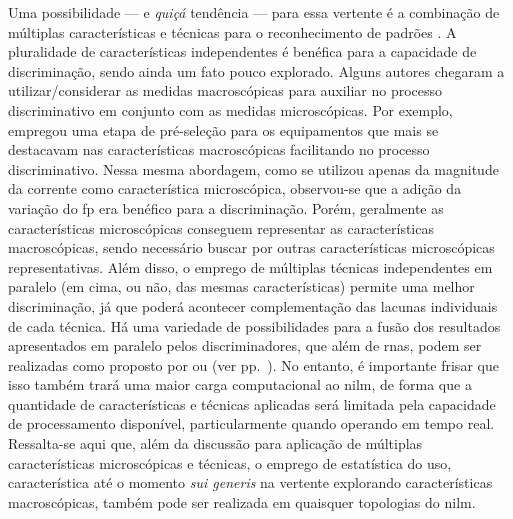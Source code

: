 Uma possibilidade --- e \emph{quiçá} tendência --- para essa vertente é a
combinação de múltiplas características e técnicas para o
reconhecimento de padrões \cite{
nilm_zeifman_vast_hisample_pdfmerge_2011,nilm_liang_pt1_2010_34,
nilm_liang_pt2_2010_40}. A pluralidade de características
independentes é benéfica para a capacidade de discriminação, sendo
ainda um fato pouco explorado. Alguns autores chegaram a
utilizar/considerar as medidas macroscópicas para auxiliar no processo
discriminativo em conjunto com as medidas microscópicas. Por exemplo,
\cite{nilm_coppe_nascimento} empregou uma etapa de pré-seleção para os
equipamentos que mais se destacavam nas características macroscópicas
facilitando no processo discriminativo. Nessa mesma abordagem, como se
utilizou apenas da magnitude da corrente como característica
microscópica, observou-se que a adição da variação do \gls{fp} era
benéfico para a discriminação. Porém, geralmente as características
microscópicas conseguem representar as características macroscópicas,
sendo necessário buscar por outras características microscópicas
representativas. Além disso, o emprego de múltiplas técnicas
independentes em paralelo (em cima, ou não, das mesmas características)
permite uma melhor discriminação, já que poderá acontecer
complementação das lacunas individuais de cada técnica. Há uma
variedade de possibilidades para a fusão dos resultados apresentados em
paralelo pelos discriminadores, que além de \glspl{rna}, podem ser
realizadas como proposto por \cite{nilm_liang_pt1_2010_34} ou
\cite{nilm_zeifman_review_2011} (ver
pp.~\pageref{text:uniao_tecnicas}). No entanto, é importante frisar que
isso também trará uma maior carga computacional ao \gls{nilm}, de
forma que a quantidade de características e técnicas aplicadas será
limitada pela capacidade de processamento disponível, particularmente
quando operando em tempo real. Ressalta-se aqui que, além da discussão
para aplicação de múltiplas características microscópicas e técnicas,
o emprego de estatística do uso, característica até o momento
\emph{sui generis} na vertente explorando características
macroscópicas, também pode ser realizada em quaisquer topologias do
\gls{nilm}.

